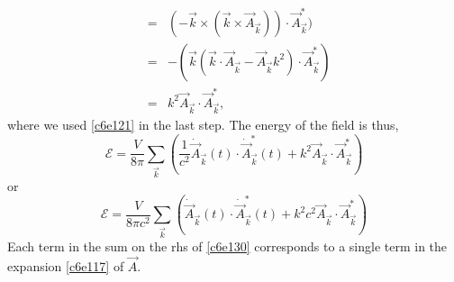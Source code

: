 \begin{enumerate}
\begin{eqnarray*}
&=& (-\vec{k}\times(\vec{k}\times\vec{A}_\vec{k}))\cdot\vec{A}_\vec{k}^\ast) \\
&=& -(\vec{k}(\vec{k}\cdot\vec{A}_\vec{k} - \vec{A}_\vec{k}k^2)\cdot\vec{A}_\vec{k}^\ast) \\
&=& k^2\vec{A}_\vec{k}\cdot\vec{A}_\vec{k}^\ast,
\end{eqnarray*}
where we used \eqref{c6e121} in the last step. The energy of the field is thus,
\[
\mathcal{E} = \frac{V}{8\pi}\sum_{\vec{k}}
\left(\frac{1}{c^2}\dot{\vec{A}}_\vec{k}(t)\cdot\dot{\vec{A}}_{\vec{k}}^\ast(t) +
k^2\vec{A}_\vec{k}\cdot\vec{A}_\vec{k}^\ast\right)
\]
or
\begin{equation}\label{c6e130}
\mathcal{E} = \frac{V}{8\pi c^2}\sum_{\vec{k}}
\left(\dot{\vec{A}}_\vec{k}(t)\cdot\dot{\vec{A}}_{\vec{k}}^\ast(t) +
k^2c^2\vec{A}_\vec{k}\cdot\vec{A}_\vec{k}^\ast\right)
\end{equation}
Each term in the sum on the rhs of \eqref{c6e130} corresponds to a single term in
the expansion \eqref{c6e117} of $\vec{A}$.


\end{enumerate}
